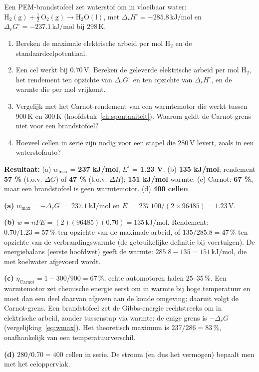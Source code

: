 \begin{oefening}
Een PEM-brandstofcel zet waterstof om in vloeibaar water: \(\mathrm{H_2(g) + \tfrac{1}{2}\,O_2(g) \rightarrow H_2O(l)}\), met \(\Delta_r H^\circ = -285.8\,\mathrm{kJ/mol}\) en \(\Delta_r G^\circ = -237.1\,\mathrm{kJ/mol}\) bij \(298\,\mathrm{K}\).

\begin{enumerate}
\item[(a)]
  Bereken de maximale elektrische arbeid per mol \(\mathrm{H_2}\) en de standaardcelpotentiaal.
\item[(b)]
  Een cel werkt bij \(0.70\,\mathrm{V}\). Bereken de geleverde elektrische arbeid per mol \(\mathrm{H_2}\), het rendement ten opzichte van \(\Delta_r G^\circ\) en ten opzichte van \(\Delta_r H^\circ\), en de warmte die per mol vrijkomt.
\item[(c)]
  Vergelijk met het Carnot-rendement van een warmtemotor die werkt tussen \(900\,\mathrm{K}\) en \(300\,\mathrm{K}\) (hoofdstuk~\ref{ch:spontaniteit}). Waarom geldt de Carnot-grens niet voor een brandstofcel?
\item[(d)]
  Hoeveel cellen in serie zijn nodig voor een stapel die \(280\,\mathrm{V}\) levert, zoals in een waterstofauto?
\end{enumerate}
\end{oefening}
\begin{oplossing}
\textbf{Resultaat:} (a) \(w_{\max}\) = \textbf{237 kJ/mol}, \(E^\circ\) = \textbf{1.23 V}. (b) \textbf{135 kJ/mol}; rendement \textbf{57 \%} (t.o.v. \(\Delta G\)) of \textbf{47 \%} (t.o.v. \(\Delta H\)); \textbf{151 kJ/mol} warmte. (c) Carnot: \textbf{67 \%}, maar een brandstofcel is geen warmtemotor. (d) \textbf{400 cellen}.

\textbf{(a)} \(w_{\max} = -\Delta_r G^\circ = 237.1\,\mathrm{kJ/mol}\) en \(E^\circ = 237\,100/(2 \times 96485) = 1.23\,\mathrm{V}\).

\textbf{(b)} \(w = nFE = (2)(96485)(0.70) = 135\,\mathrm{kJ/mol}\). Rendement: \(0.70/1.23 = 57\,\%\) ten opzichte van de maximale arbeid, of \(135/285.8 = 47\,\%\) ten opzichte van de verbrandingswarmte (de gebruikelijke definitie bij voertuigen). De energiebalans (eerste hoofdwet) geeft de warmte: \(285.8 - 135 = 151\,\mathrm{kJ/mol}\), die met koelwater afgevoerd wordt.

\textbf{(c)} \(\eta_{\text{Carnot}} = 1 - 300/900 = 67\,\%\); echte automotoren halen \(25\)--\(35\,\%\). Een warmtemotor zet chemische energie eerst om in warmte bij hoge temperatuur en moet dan een deel daarvan afgeven aan de koude omgeving; daaruit volgt de Carnot-grens. Een brandstofcel zet de Gibbs-energie rechtstreeks om in elektrische arbeid, zonder tussenstap via warmte: de enige grens is \(-\Delta_r G\) (vergelijking~\eqref{eq:wmax}). Het theoretisch maximum is \(237/286 = 83\,\%\), onafhankelijk van een temperatuurverschil.

\textbf{(d)} \(280/0.70 = 400\) cellen in serie. De stroom (en dus het vermogen) bepaalt men met het celoppervlak.
\end{oplossing}

